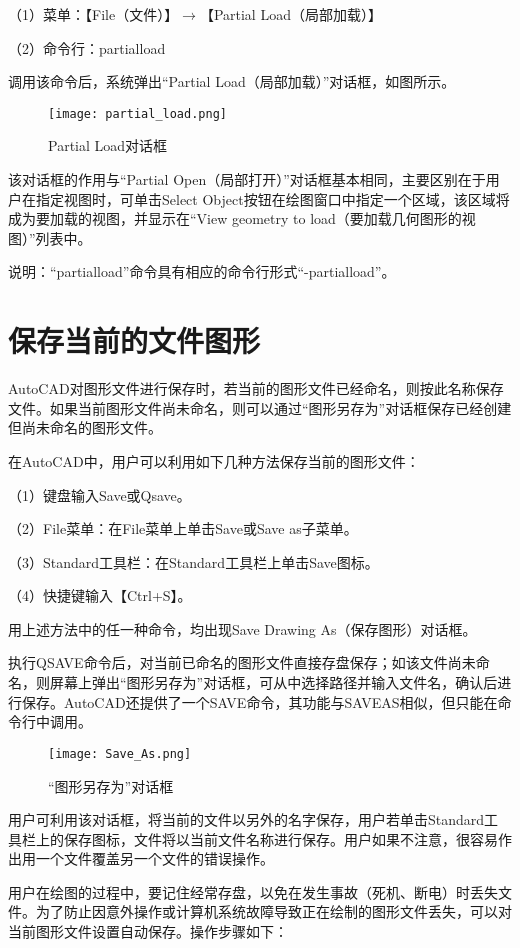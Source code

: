（1）菜单：【File（文件）】$\to$【Partial Load（局部加载）】

（2）命令行：partialload

调用该命令后，系统弹出“Partial Load（局部加载）”对话框，如图所示。

\begin{figure}[htbp]
\centering
\texttt{[image: partial\_load.png]}
\caption{Partial Load对话框}
\end{figure}

该对话框的作用与“Partial Open（局部打开）”对话框基本相同，主要区别在于用户在指定视图时，可单击Select Object按钮在绘图窗口中指定一个区域，该区域将成为要加载的视图，并显示在“View geometry to load（要加载几何图形的视图）”列表中。

说明：“partialload”命令具有相应的命令行形式“-partialload”。

\chapter{保存当前的文件图形}

AutoCAD对图形文件进行保存时，若当前的图形文件已经命名，则按此名称保存文件。如果当前图形文件尚未命名，则可以通过“图形另存为”对话框保存已经创建但尚未命名的图形文件。

在AutoCAD中，用户可以利用如下几种方法保存当前的图形文件：

（1）键盘输入Save或Qsave。

（2）File菜单：在File菜单上单击Save或Save as子菜单。

（3）Standard工具栏：在Standard工具栏上单击Save图标。

（4）快捷键输入【Ctrl+S】。

用上述方法中的任一种命令，均出现Save Drawing As（保存图形）对话框。

执行QSAVE命令后，对当前已命名的图形文件直接存盘保存；如该文件尚未命名，则屏幕上弹出“图形另存为”对话框，可从中选择路径并输入文件名，确认后进行保存。AutoCAD还提供了一个SAVE命令，其功能与SAVEAS相似，但只能在命令行中调用。

\begin{figure}[htbp]
\centering
\texttt{[image: Save\_As.png]}
\caption{“图形另存为”对话框}
\end{figure}

用户可利用该对话框，将当前的文件以另外的名字保存，用户若单击Standard工具栏上的保存图标，文件将以当前文件名称进行保存。用户如果不注意，很容易作出用一个文件覆盖另一个文件的错误操作。

用户在绘图的过程中，要记住经常存盘，以免在发生事故（死机、断电）时丢失文件。为了防止因意外操作或计算机系统故障导致正在绘制的图形文件丢失，可以对当前图形文件设置自动保存。操作步骤如下：


